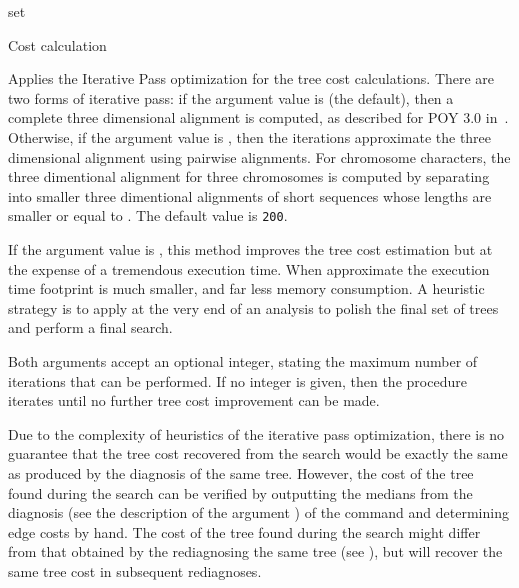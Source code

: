 \begin{command}{set}{}
\begin{arguments}
\begin{argumentgroup}{Cost calculation}
                {Applies the Iterative Pass optimization for the tree cost
                calculations. There are two forms of iterative pass: if the
                argument value is  (the default), then a complete three
                dimensional alignment is computed, as described for POY 3.0 in~\cite{wheeler2003a}. 
                Otherwise, if the argument value is , then the iterations
                approximate the three dimensional alignment using pairwise
                alignments. 
                For chromosome characters, 
                the three dimentional alignment for three chromosomes
                is computed by separating into smaller three dimentional
                alignments of short sequences whose lengths are smaller 
                or equal to . The default value
                is \texttt{200}.

                If the argument value is , this method improves the tree
                cost estimation but at the expense of a tremendous execution
                time. When approximate the execution time footprint is much
                smaller, and far less memory consumption.
                A heuristic strategy is to apply   at the 
                very end of an analysis to polish the final set of trees and perform a final search. 
                
                Both arguments accept an optional integer, stating the maximum
                number of iterations that can be performed. If no integer is
                given, then the procedure iterates until no further tree cost
                improvement can be made.}
                {}
                
	\begin{statement}
  	  Due to the complexity of heuristics of the iterative pass optimization, there is no
	  guarantee that the tree cost recovered from the search would be exactly the same
	  as produced by the diagnosis of the same tree. However, the cost of the tree found during
	  the search can be verified by outputting the medians from the diagnosis
      (see the description of the argument )
      of the command  and determining edge costs by hand. The cost of the tree found during the search might
	  differ from that obtained by the rediagnosing the same tree (see ), but will
	  recover the same tree cost in subsequent rediagnoses.


\end{statement}
\end{argumentgroup}
\end{arguments}
\end{command}
